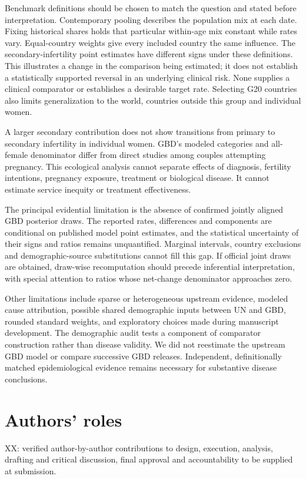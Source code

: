 \documentclass[11pt,a4paper]{article}
\begin{document}
Benchmark definitions should be chosen to match the question and stated before interpretation. Contemporary pooling describes the population mix at each date. Fixing historical shares holds that particular within-age mix constant while rates vary. Equal-country weights give every included country the same influence. The secondary-infertility point estimates have different signs under these definitions. This illustrates a change in the comparison being estimated; it does not establish a statistically supported reversal in an underlying clinical risk. None supplies a clinical comparator or establishes a desirable target rate. Selecting G20 countries also limits generalization to the world, countries outside this group and individual women.

A larger secondary contribution does not show transitions from primary to secondary infertility in individual women. GBD's modeled categories and all-female denominator differ from direct studies among couples attempting pregnancy. This ecological analysis cannot separate effects of diagnosis, fertility intentions, pregnancy exposure, treatment or biological disease. It cannot estimate service inequity or treatment effectiveness.

The principal evidential limitation is the absence of confirmed jointly aligned GBD posterior draws. The reported rates, differences and components are conditional on published model point estimates, and the statistical uncertainty of their signs and ratios remains unquantified. Marginal intervals, country exclusions and demographic-source substitutions cannot fill this gap. If official joint draws are obtained, draw-wise recomputation should precede inferential interpretation, with special attention to ratios whose net-change denominator approaches zero.

Other limitations include sparse or heterogeneous upstream evidence, modeled cause attribution, possible shared demographic inputs between UN and GBD, rounded standard weights, and exploratory choices made during manuscript development. The demographic audit tests a component of comparator construction rather than disease validity. We did not reestimate the upstream GBD model or compare successive GBD releases. Independent, definitionally matched epidemiological evidence remains necessary for substantive disease conclusions.

\section*{Authors' roles}
XX: verified author-by-author contributions to design, execution, analysis, drafting and critical discussion, final approval and accountability to be supplied at submission.
\end{document}
